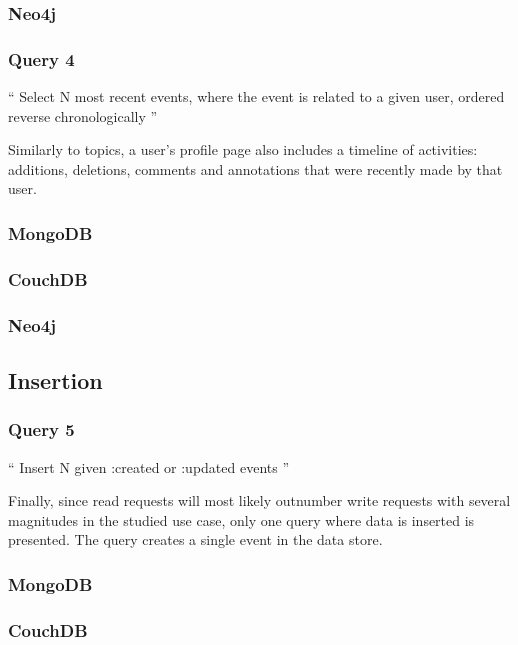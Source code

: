 \subsubsection*{Neo4j}

\subsubsection{Query 4}
\label{subsubsec:query-4}

``
Select N most recent events, where the event is related to a given user, ordered reverse chronologically
''

Similarly to topics, a user's profile page also includes a timeline of  activities: additions, deletions, comments and annotations that were recently made by that user.

\subsubsection*{MongoDB}
\subsubsection*{CouchDB}
\subsubsection*{Neo4j}

\subsection{Insertion}
\label{subsec:insertion}

\subsubsection{Query 5}
\label{subsubsec:query-5}

``
Insert N given :created or :updated events
''

Finally, since read requests will most likely outnumber write requests with several magnitudes in the studied use case, only one query where data is inserted is presented.
The query creates a single event in the data store.

\subsubsection*{MongoDB}
\subsubsection*{CouchDB}
